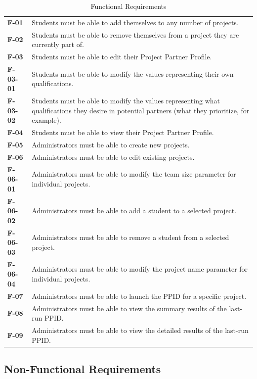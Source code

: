 \documentclass[12pt,letterpaper]{article}
\begin{document}
\begin{table}[H]
	\caption{Functional Requirements}
	\vspace{1em}
	\begin{tabu} to 
		F-01 & Students must be able to add themselves to any number of projects. \\
		F-02 & Students must be able to remove themselves from a project they are currently part of. \\
		F-03 & Students must be able to edit their Project Partner Profile. \\
		\ccindent{}F-03-01 & \ccindent{}Students must be able to modify the values representing their own qualifications. \\
		\ccindent{}F-03-02 & \ccindent{}Students must be able to modify the values representing what qualifications they
		desire in potential partners (what they prioritize, for example). \\
		F-04 & Students must be able to view their Project Partner Profile. \\
		F-05 & Administrators must be able to create new projects. \\
		F-06 & Administrators must be able to edit existing projects. \\
		\ccindent{}F-06-01 & \ccindent{}Administrators must be able to modify the team size parameter for individual projects. \\
		\ccindent{}F-06-02 & \ccindent{}Administrators must be able to add a student to a selected project. \\
		\ccindent{}F-06-03 & \ccindent{}Administrators must be able to remove a student from a selected project. \\
		\ccindent{}F-06-04 & \ccindent{}Administrators must be able to modify the project name parameter for individual projects.\\
		F-07 & Administrators must be able to launch the PPID for a specific project. \\
		F-08 & Administrators must be able to view the summary results of the last-run PPID. \\
		F-09 & Administrators must be able to view the detailed results of the last-run PPID. \\
	\end{tabu}
\end{table}

\subsection{Non-Functional Requirements}
\end{document}
